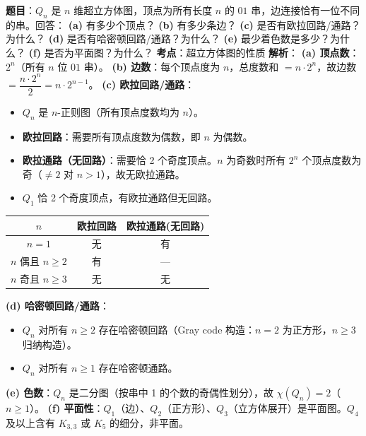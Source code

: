 \documentclass[10pt,a4paper,openany]{ctexbook}
\theoremstyle{definition}
\theoremstyle{remark}
\begin{document}
\textbf{题目}：$Q_n$ 是 $n$ 维超立方体图，顶点为所有长度 $n$ 的 $01$ 串，边连接恰有一位不同的串。回答：
\textbf{(a)} 有多少个顶点？
\textbf{(b)} 有多少条边？
\textbf{(c)} 是否有欧拉回路/通路？为什么？
\textbf{(d)} 是否有哈密顿回路/通路？为什么？
\textbf{(e)} 最少着色数是多少？为什么？
\textbf{(f)} 是否为平面图？为什么？
\textbf{考点}：超立方体图的性质
\textbf{解析}：
\textbf{(a) 顶点数}：$2^n$（所有 $n$ 位 $01$ 串）。
\textbf{(b) 边数}：每个顶点度为 $n$，总度数和 $= n \cdot 2^n$，故边数 $= \dfrac{n \cdot 2^n}{2} = n \cdot 2^{n-1}$。
\textbf{(c) 欧拉回路/通路}：
\begin{itemize}
\item $Q_n$ 是 $n$-正则图（所有顶点度数均为 $n$）。
\item \textbf{欧拉回路}：需要所有顶点度数为偶数，即 $n$ 为偶数。
\item \textbf{欧拉通路（无回路）}：需要恰 2 个奇度顶点。$n$ 为奇数时所有 $2^n$ 个顶点度数为奇（$\neq 2$ 对 $n > 1$），故无欧拉通路。
\item $Q_1$ 恰 2 个奇度顶点，有欧拉通路但无回路。

\end{itemize}

\begin{center}
\begin{tabular}{ccc}
\hline
$n$ & 欧拉回路 & 欧拉通路(无回路) \\ \hline
$n=1$ & 无 & 有 \\
$n$ 偶且 $n\ge 2$ & 有 & — \\
$n$ 奇且 $n\ge 3$ & 无 & 无 \\
\hline
\end{tabular}

\end{center}

\textbf{(d) 哈密顿回路/通路}：
\begin{itemize}
\item $Q_n$ 对所有 $n \ge 2$ 存在哈密顿回路（Gray code 构造：$n=2$ 为正方形，$n \ge 3$ 归纳构造）。
\item $Q_n$ 对所有 $n \ge 1$ 存在哈密顿通路。

\end{itemize}

\textbf{(e) 色数}：$Q_n$ 是二分图（按串中 1 的个数的奇偶性划分），故 $\chi(Q_n) = 2$（$n \ge 1$）。
\textbf{(f) 平面性}：$Q_1$（边）、$Q_2$（正方形）、$Q_3$（立方体展开）是平面图。$Q_4$ 及以上含有 $K_{3,3}$ 或 $K_5$ 的细分，非平面。
\vspace{-2pt}
\end{document}

